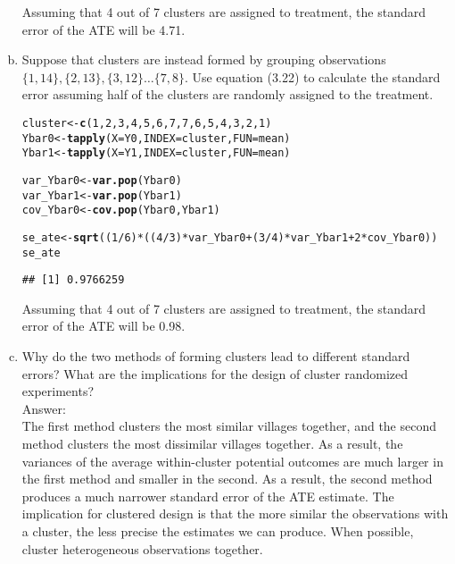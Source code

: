 \documentclass[11pt,notitlepage]{article}\usepackage[]{graphicx}\usepackage[]{color}
\makeatletter
\newcommand{\hlnum}[1]{\textcolor[rgb]{0.686,0.059,0.569}{#1}}%
\newcommand{\hlopt}[1]{\textcolor[rgb]{0,0,0}{#1}}%
\newcommand{\hlstd}[1]{\textcolor[rgb]{0.345,0.345,0.345}{#1}}%
\newcommand{\hlkwb}[1]{\textcolor[rgb]{0.69,0.353,0.396}{#1}}%
\newcommand{\hlkwc}[1]{\textcolor[rgb]{0.333,0.667,0.333}{#1}}%
\newcommand{\hlkwd}[1]{\textcolor[rgb]{0.737,0.353,0.396}{\textbf{#1}}}%
\newenvironment{kframe}{%
 \def\at@end@of@kframe{}%
 \ifinner\ifhmode%
  \def\at@end@of@kframe{\end{minipage}}%
  \begin{minipage}{\columnwidth}%
 \fi\fi%
 \def\FrameCommand##1{\hskip\@totalleftmargin \hskip-\fboxsep
 \colorbox{shadecolor}{##1}\hskip-\fboxsep
     \hskip-\linewidth \hskip-\@totalleftmargin \hskip\columnwidth}%
 \MakeFramed {\advance\hsize-\width
   \@totalleftmargin\z@ \linewidth\hsize
   \@setminipage}}%
 {\par\unskip\endMakeFramed%
 \at@end@of@kframe}
\newenvironment{knitrout}{}{} %
\makeatother
\begin{document}
\begin{enumerate}[a)]
Assuming that 4 out of 7 clusters are assigned to treatment, the standard error of the ATE will be 4.71.

\item Suppose that clusters are instead formed by grouping observations $\{1,14\},\{2,13\},\{3,12\}\ldots\{7,8\}$. Use equation (3.22) to calculate the standard error assuming half of the clusters are randomly assigned to the treatment.

\begin{knitrout}
\color{fgcolor}\begin{kframe}
\begin{alltt}
\hlstd{cluster} \hlkwb{<-} \hlkwd{c}\hlstd{(}\hlnum{1}\hlstd{,}\hlnum{2}\hlstd{,}\hlnum{3}\hlstd{,}\hlnum{4}\hlstd{,}\hlnum{5}\hlstd{,}\hlnum{6}\hlstd{,}\hlnum{7}\hlstd{,}\hlnum{7}\hlstd{,}\hlnum{6}\hlstd{,}\hlnum{5}\hlstd{,}\hlnum{4}\hlstd{,}\hlnum{3}\hlstd{,}\hlnum{2}\hlstd{,}\hlnum{1}\hlstd{)}
\hlstd{Ybar0} \hlkwb{<-} \hlkwd{tapply}\hlstd{(}\hlkwc{X}\hlstd{=Y0,} \hlkwc{INDEX}\hlstd{=cluster,} \hlkwc{FUN}\hlstd{=mean)}
\hlstd{Ybar1} \hlkwb{<-} \hlkwd{tapply}\hlstd{(}\hlkwc{X}\hlstd{=Y1,} \hlkwc{INDEX}\hlstd{=cluster,} \hlkwc{FUN}\hlstd{=mean)}

\hlstd{var_Ybar0} \hlkwb{<-} \hlkwd{var.pop}\hlstd{(Ybar0)}
\hlstd{var_Ybar1} \hlkwb{<-} \hlkwd{var.pop}\hlstd{(Ybar1)}
\hlstd{cov_Ybar0} \hlkwb{<-} \hlkwd{cov.pop}\hlstd{(Ybar0,Ybar1)}

\hlstd{se_ate} \hlkwb{<-} \hlkwd{sqrt}\hlstd{((}\hlnum{1}\hlopt{/}\hlnum{6}\hlstd{)} \hlopt{*} \hlstd{((}\hlnum{4}\hlopt{/}\hlnum{3}\hlstd{)}\hlopt{*}\hlstd{var_Ybar0} \hlopt{+} \hlstd{(}\hlnum{3}\hlopt{/}\hlnum{4}\hlstd{)}\hlopt{*}\hlstd{var_Ybar1} \hlopt{+} \hlnum{2}\hlopt{*}\hlstd{cov_Ybar0))}
\hlstd{se_ate}
\end{alltt}
\begin{verbatim}
## [1] 0.9766259
\end{verbatim}
\end{kframe}
\end{knitrout}

Assuming that 4 out of 7 clusters are assigned to treatment, the standard error of the ATE will be 0.98.

\item Why do the two methods of forming clusters lead to different standard errors? What are the implications for the design of cluster randomized experiments?\\
Answer:\\
The first method clusters the most similar villages together, and the second method clusters the most dissimilar villages together. As a result, the variances of the average within-cluster potential outcomes are much larger in the first method and smaller in the second. As a result, the second method produces a much narrower standard error of the ATE estimate. The implication for clustered design is that the more similar the observations with a cluster, the less precise the estimates we can produce. When possible, cluster heterogeneous observations together.
\end{enumerate}
\end{document}
